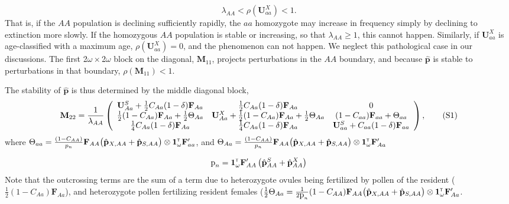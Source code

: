 \documentclass[11pt]{article}
\newcommand\numberthis{\addtocounter{equation}{1}\tag{\theequation}}
\def\mbf#1{\mathbf{#1}}
\newcommand{\tr}{{\mbox{\tiny \sf T}}}
\begin{document}
\begin{equation}
  \lambda_{AA}<\rho\left(\mathbf{U}^X_{aa} \right)<1.
\end{equation}
 That is, if the $AA$ population is declining sufficiently rapidly, the $aa$ homozygote may increase in frequency simply by declining to extinction more slowly. If the homozygous $AA$ population is stable or increasing, so that $\lambda_{AA} \geq 1$, this cannot happen. Similarly, if $\mathbf{U}^X_{aa}$ is age-classified with a maximum age, $\rho(\mathbf{U}^X_{aa})=0$, and the phenomenon can not happen.  We neglect this pathological case in our discussions.  The first 2$\omega\times$2$\omega$ block on the diagonal, $\mathbf{M}_{11}$, projects perturbations in the $AA$ boundary, and because $\hat{\mathbf{p}}$ is stable to perturbations in that boundary, $\rho(\mathbf{M}_{11})<1$. 

The stability of $\hat{\mathbf{p}}$ is thus determined by the middle diagonal block, 
{
\footnotesize
 \begin{align*} \label{eq:M22}
	\mbf{M}_{22} = 
		\frac{1}{\lambda_{AA}}\left(\begin{array}{ccc}
\mathbf{U}^S_{Aa} +\frac{1}{2} C_{Aa} (1 - \delta) \mbf{F}_{Aa} & \frac{1}{2} C_{Aa} (1 - \delta) \mbf{F}_{Aa}  & 0 \\
 \frac{1}{2} (1 - C_{Aa}) \mbf{F}_{Aa}+\frac{1}{2}  \Theta_{Aa} &\mathbf{U}^X_{Aa} + \frac{1}{2} (1 - C_{Aa}) \mbf{F}_{Aa} +\frac{1}{2}\Theta_{Aa} & (1-C_{aa})\mbf{F}_{aa} + \Theta_{aa}\\
  \frac{1}{4} C_{Aa} (1 - \delta) \mbf{F}_{Aa} & \frac{1}{4} C_{Aa} (1 - \delta) \mbf{F}_{Aa}  &\mathbf{U}^S_{aa} +C_{aa} (1 - \delta) \mbf{F}_{aa}  \\ 
			\end{array} \right), \numberthis
\end{align*}
}
where $\Theta_{aa} = \frac{(1 - C_{AA})}{p_{n}} \mbf{F}_{AA} \big(\hat{\mbf{p}}_{X,AA}+ \hat{\mbf{p}}_{S,AA}  \big) \otimes \mathbf{1}^\tr_{\omega} \mathbf{F}_{aa}^\prime$, and  $\Theta_{Aa} = \frac{(1 - C_{AA})}{p_{n}} \mbf{F}_{AA} \big(\hat{\mbf{p}}_{X,AA}+ \hat{\mbf{p}}_{S,AA}  \big) \otimes \mathbf{1}^\tr_{\omega} \mathbf{F}_{Aa}^\prime$

\begin{equation}
  \mbox{p}_{n}=\mathbf{1}^\tr_\omega \mathbf{F}_{AA}^\prime \left( \hat{\mathbf{p}}^S_{AA}+\hat{\mathbf{p}}^X_{AA} \right)	
\end{equation}
Note that the outcrossing terms are the sum of a term due to heterozygote ovules being fertilized by pollen of the resident ($\frac{1}{2} (1 - C_{Aa}) \mbf{F}_{Aa}$), and heterozygote pollen fertilizing resident females ($\frac{1}{2 }\Theta_{Aa}=\frac{1}{2  \mbox{p}_{n}} (1 - C_{AA})\mbf{F}_{AA} \big(\hat{\mbf{p}}_{X,AA}+ \hat{\mbf{p}}_{S,AA}  \big) \otimes \mathbf{1}^\tr_{\omega} \mathbf{F}_{Aa}^\prime$.
\end{document}
